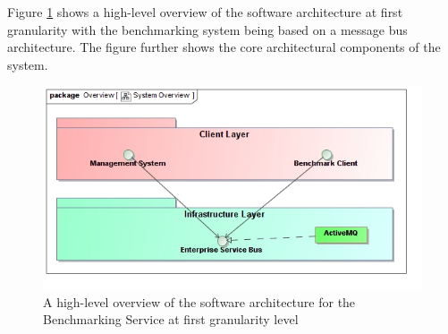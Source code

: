 Figure \ref{fig:softwareArchitecture} shows a high-level overview of the 
software architecture at first granularity with the benchmarking system being
based on a message bus  architecture. The figure further shows the core
architectural components of the system.
\begin{figure}[H]
  \begin{center}
  \includegraphics[scale=0.4]{../Diagrams and Charts/Overview/SystemOverview.jpg}
  \caption{A high-level overview of the software architecture for the Benchmarking Service at first granularity level}
  \label{fig:softwareArchitecture}
  \end{center}
\end{figure}

